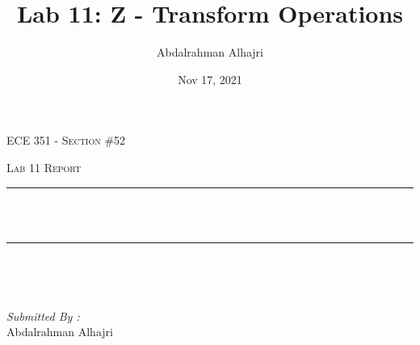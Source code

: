 \documentclass[12pt]{report}
\title{Lab 11: Z - Transform Operations}
\author{Abdalrahman Alhajri}
\date{Nov 17, 2021}
\makeatletter
\let\thetitle\@title
\makeatother
\begin{document}

\begin{titlepage}
	\centering
    \vspace*{0.5 cm}
\begin{center}    \textsc{\Large   ECE 351 - Section \#52 }\\[2.0 cm]	\end{center}%
	\textsc{\Large Lab 11 Report }\\[0.5 cm]				%
	\rule{\linewidth}{0.2 mm} \\[0.4 cm]
	{ \huge \bfseries \thetitle}\\
	\rule{\linewidth}{0.2 mm} \\[1.5 cm]
	
	\begin{minipage}{0.4\textwidth}
		\begin{flushleft} \large
			\end{flushleft}
			\end{minipage}~
			\begin{minipage}{0.4\textwidth}
            
			\begin{flushright} \large
			\emph{Submitted By :} \\
			Abdalrahman Alhajri 
		\end{flushright}
           
	\end{minipage}\\[2 cm]
	
    
    
    
    
	
\end{titlepage}


\tableofcontents
\pagebreak

\renewcommand{\thesection}{\arabic{section}}
\end{document}

